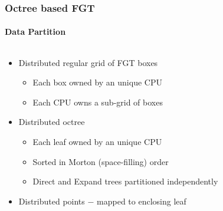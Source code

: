 \begin{frame}
\frametitle{Octree based FGT}
\framesubtitle{Data Partition}
\begin{columns}[T]
\begin{column}{0.6\textwidth}
\begin{itemize}
\item Distributed regular grid of FGT boxes
\begin{itemize}
\item Each box owned by an unique CPU
\item Each CPU owns a sub-grid of boxes
\newline
\end{itemize}
\item Distributed octree
\begin{itemize}
\item Each leaf owned by an unique CPU
\item Sorted in Morton (space-filling) order
\item Direct and Expand trees partitioned independently
\newline
\end{itemize}
\item Distributed points $-$ mapped to enclosing leaf
\end{itemize}
\end{column}
\end{columns}
\end{frame}

